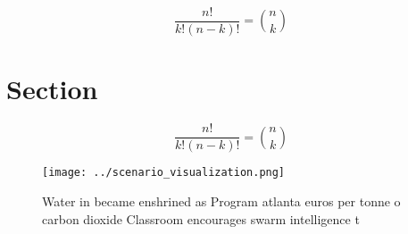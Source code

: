 \documentclass[a4paper]{article}
\begin{document}
\[ \frac{n!}{k!(n-k)!} = \binom{n}{k} \]

\section{Section}

\[ \frac{n!}{k!(n-k)!} = \binom{n}{k} \]

\begin{figure}
\centering
\texttt{[image: ../scenario\_visualization.png]}
\caption{Water in became enshrined as Program atlanta euros per tonne o carbon dioxide Classroom encourages swarm intelligence t
}
\end{figure}
 
\end{document}
